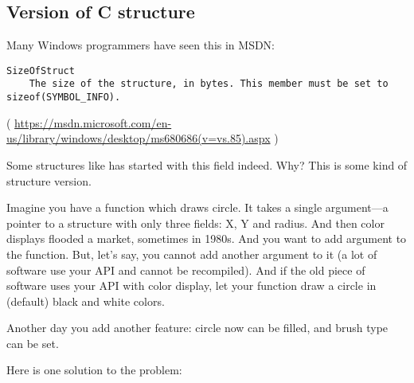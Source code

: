 \subsection{Version of C structure}

Many Windows programmers have seen this in MSDN:

\begin{lstlisting}
SizeOfStruct
    The size of the structure, in bytes. This member must be set to sizeof(SYMBOL_INFO).
\end{lstlisting}

( \url{https://msdn.microsoft.com/en-us/library/windows/desktop/ms680686(v=vs.85).aspx} )

Some structures like  has started with this field indeed. Why?
This is some kind of structure version.

Imagine you have a function which draws circle.
It takes a single argument---a pointer to a structure with only three fields: X, Y and radius.
And then color displays flooded a market, sometimes in 1980s. And you want to add  argument to the function.
But, let's say, you cannot add another argument to it (a lot of software use your \ac{API} and cannot be recompiled).
And if the old piece of software uses your \ac{API} with color display,
let your function draw a circle in (default) black and white colors.

Another day you add another feature: circle now can be filled, and brush type can be set.

Here is one solution to the problem:

